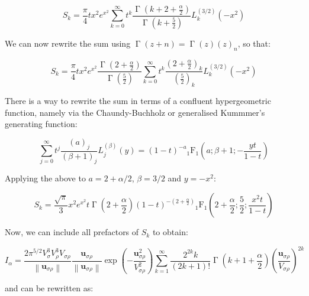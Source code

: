 \begin{equation*}
    S_k=\frac{\pi}{4}tx^2e^{x^2}\sum_{k=0}^\infty t^k\frac{\operatorname{\Gamma}{\left(k+2+\frac{\alpha}{2}\right)}}{\operatorname{\Gamma}{\left(k+\frac{5}{2}\right)}}L_{k}^{(3/2)}\left(-x^2\right)
\end{equation*}

We can now rewrite the sum using $\operatorname{\Gamma}{\left(z+n\right)}=\operatorname{\Gamma}{\left(z\right)}(z)_n$, so that:

\begin{equation*}
    S_k=\frac{\pi}{4}tx^2e^{x^2}\frac{\operatorname{\Gamma}{\left(2+\frac{\alpha}{2}\right)}}{\operatorname{\Gamma}{\left(\frac{5}{2}\right)}}\sum_{k=0}^\infty t^k\frac{\left(2+\frac{\alpha}{2}\right)_k}{\left(\frac{5}{2}\right)_k}L_k^{(3/2)}\left(-x^2\right)
\end{equation*}

There is a way to rewrite the sum in terms of a confluent hypergeometric function, namely via the Chaundy-Buchholz or generalised Kummmer's generating function:

\begin{equation*}
\sum_{j=0}^\infty t^j \frac{(a)_j}{(\beta+1)_j} L_j^{(\beta)}(y) = (1-t)^{-a} \operatorname{_1F_1}{\left(a; \beta+1; -\frac{yt}{1-t}\right)}
\end{equation*}

Applying the above to $a=2+\alpha/2$, $\beta=3/2$ and $y=-x^2$:

\begin{equation*}
S_k=\frac{\sqrt{\pi}}{3} x^2 e^{x^2} t \operatorname{\Gamma}{\left(2+\frac{\alpha}{2}\right)} (1-t)^{-\left(2+\frac{\alpha}{2}\right)} \operatorname{_1F_1}{\left(2+\frac{\alpha}{2}; \frac{5}{2}; \frac{x^2 t}{1-t}\right)}
\end{equation*}

Now, we can include all prefactors of $S_k$ to obtain:

\begin{equation*}
    I_\alpha=\frac{2\pi^{5/2}V_{\sigma}^3 V_\rho^3 V_{\sigma\rho}}{\left\|\mathbf{u}_{\sigma\rho}\right\|}\frac{\mathbf{u}_{\sigma\rho}}{\left\|\mathbf{u}_{\sigma\rho}\right\|}\exp{\left(-\frac{\mathbf{u}_{\sigma\rho}^2}{V_{\sigma\rho}^2}\right)}\sum_{k=1}^\infty \frac{2^{2k}k}{(2k+1)!}\operatorname{\Gamma}{\left(k+1+\frac{\alpha}{2}\right)}\left(\frac{\mathbf{u}_{\sigma\rho}}{V_{\sigma\rho}}\right)^{2k}
\end{equation*}

and can be rewritten as:

